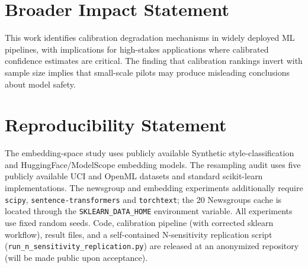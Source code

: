 \documentclass[11pt]{article}
\begin{document}
\section*{Broader Impact Statement}

This work identifies calibration degradation mechanisms in widely deployed ML pipelines, with implications for high-stakes applications where calibrated confidence estimates are critical. The finding that calibration rankings invert with sample size implies that small-scale pilots may produce misleading conclusions about model safety.

\section*{Reproducibility Statement}

The embedding-space study uses publicly available Synthetic style-classification and HuggingFace/ModelScope embedding models. The resampling audit uses five publicly available UCI and OpenML datasets and standard scikit-learn implementations. The newsgroup and embedding experiments additionally require \texttt{scipy}, \texttt{sentence-transformers} and \texttt{torchtext}; the 20 Newsgroups cache is located through the \texttt{SKLEARN\_DATA\_HOME} environment variable. All experiments use fixed random seeds. Code, calibration pipeline (with corrected sklearn workflow), result files, and a self-contained N-sensitivity replication script (\texttt{run\_n\_sensitivity\_replication.py}) are released at an anonymized repository (will be made public upon acceptance).
\end{document}
